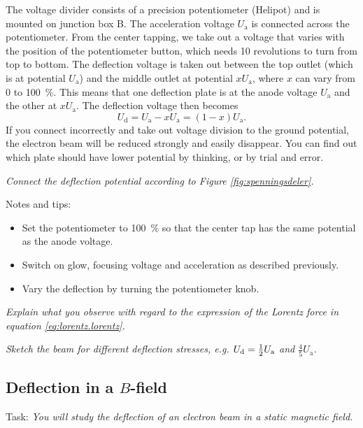 \documentclass[../Elmag-labhefte-2020.tex]{subfiles}
\begin{document}
The voltage divider consists of a precision potentiometer (Helipot) and is mounted on junction box B. The acceleration voltage $U_\mathrm{a}$ is connected across the potentiometer. From the center tapping, we take out a voltage that varies with the position of the potentiometer button, which needs 10 revolutions to turn from top to bottom. The deflection voltage is taken out between the top outlet (which is at potential $U_\mathrm{a}$) and the middle outlet at potential $x  U_\mathrm{a}$, where $x$ can vary from 0 to \SI{100}{\percent}. This means that one deflection plate is at the anode voltage $U_\mathrm{a}$ and the other at $x  U_\mathrm{a}$. The deflection voltage then becomes
\begin{equation}
    U_\mathrm{d} 
        = U_\mathrm{a} - x U_\mathrm{a} 
        = (1 - x) U_\mathrm{a}.
\end{equation}
If you connect incorrectly and take out voltage division to the ground potential, the electron beam will be reduced strongly and easily disappear. You can find out which plate should have lower potential by thinking, or by trial and error.

\emph{Connect the deflection potential according to Figure \ref{fig:spenningsdeler}.}
 

Notes and tips:
\begin{itemize}
    \item Set the potentiometer to \SI{100}{\percent} so that the center tap has the same potential as the anode voltage.
    \item Switch on glow, focusing voltage and acceleration as described previously.
    \item Vary the deflection by turning the potentiometer knob.
\end{itemize}

\emph{Explain what you observe with regard to the expression of the Lorentz force in equation \eqref{eq:lorentz.lorentz}.}

\emph{Sketch the beam for different deflection stresses, e.g. $U_\mathrm{d} = \frac{1}{2}  U_\mathrm{a}$ and $\frac{4}{5} U_\mathrm{a}$.}


 
\subsection{Deflection in a \(B\)-field}

Task:
\emph{You will study the deflection of an electron beam in a static magnetic field.}
\end{document}
